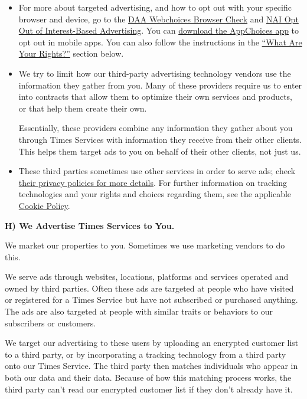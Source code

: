 \begin{itemize}
\item
  For more about targeted advertising, and how to opt out with your
  specific browser and device, go to the
  \href{http://optout.aboutads.info/?c=2\&lang=EN}{DAA Webchoices
  Browser Check} and
  \href{http://optout.networkadvertising.org/?c=1}{NAI Opt Out of
  Interest-Based Advertising}. You can
  \href{https://youradchoices.com/appchoices}{download the AppChoices
  app} to opt out in mobile apps. You can also follow the instructions
  in the \protect\hyperlink{anchor-question4}{``What Are Your Rights?''}
  section below.
\item
  We try to limit how our third-party advertising technology vendors use
  the information they gather from you. Many of these providers require
  us to enter into contracts that allow them to optimize their own
  services and products, or that help them create their own.

  Essentially, these providers combine any information they gather about
  you through Times Services with information they receive from their
  other clients. This helps them target ads to you on behalf of their
  other clients, not just us.
\item
  These third parties sometimes use other services in order to serve
  ads; check \href{/privacy/third-party}{their privacy policies for more
  details}. For further information on tracking technologies and your
  rights and choices regarding them, see the applicable
  \href{https://www.nytimes3xbfgragh.onion/subscription/dg-cookie-policy/cookie-policy.html}{Cookie
  Policy}.
\end{itemize}

\textbf{H) We Advertise Times Services to You.}

We market our properties to you. Sometimes we use marketing vendors to
do this.

We serve ads through websites, locations, platforms and services
operated and owned by third parties. Often these ads are targeted at
people who have visited or registered for a Times Service but have not
subscribed or purchased anything. The ads are also targeted at people
with similar traits or behaviors to our subscribers or customers.

We target our advertising to these users by uploading an encrypted
customer list to a third party, or by incorporating a tracking
technology from a third party onto our Times Service. The third party
then matches individuals who appear in both our data and their data.
Because of how this matching process works, the third party can't read
our encrypted customer list if they don't already have it.

